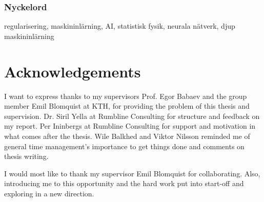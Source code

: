 \subsection*{Nyckelord}
regularisering, maskininlärning, AI, statistisk fysik, neurala nätverk, djup maskininlärning

\afterpage{\blankpage}

\afterpage{\blankpage}


\newpage
\thispagestyle{plain}
\chapter*{Acknowledgements}
I want to express thanks to my supervisors Prof. Egor Babaev and the group member Emil Blomquist at KTH, for providing the problem of this thesis and supervision. Dr. Siril Yella at Rumbline Consulting for structure and feedback on my report. Per Ininbergs at Rumbline Consulting for support and motivation in what comes after the thesis. Wile Balkhed and Viktor Nilsson reminded me of general time management's importance to get things done and comments on thesis writing. 

I would most like to thank my supervisor Emil Blomquist for collaborating. Also, introducing me to this opportunity and the hard work put into start-off and exploring in a new direction.

\afterpage{\blankpage}

\newpage

\thispagestyle{plain}

\tableofcontents

\newpage
{}

